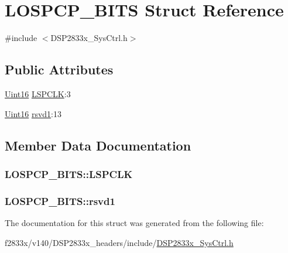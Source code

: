 \hypertarget{struct_l_o_s_p_c_p___b_i_t_s}{}\section{L\+O\+S\+P\+C\+P\+\_\+\+B\+I\+T\+S Struct Reference}
\label{struct_l_o_s_p_c_p___b_i_t_s}


{\ttfamily \#include $<$D\+S\+P2833x\+\_\+\+Sys\+Ctrl.\+h$>$}

\subsection*{Public Attributes}
\begin{DoxyCompactItemize}
\item 
\hyperlink{_d_s_p2833x___device_8h_a59a9f6be4562c327cbfb4f7e8e18f08b}{Uint16} \hyperlink{struct_l_o_s_p_c_p___b_i_t_s_a766a0fe048d5e1343de743d2202a2e16}{L\+S\+P\+C\+L\+K}\+:3
\item 
\hyperlink{_d_s_p2833x___device_8h_a59a9f6be4562c327cbfb4f7e8e18f08b}{Uint16} \hyperlink{struct_l_o_s_p_c_p___b_i_t_s_add9555cb679167bb194e235d81e5dcc3}{rsvd1}\+:13
\end{DoxyCompactItemize}


\subsection{Member Data Documentation}
\hypertarget{struct_l_o_s_p_c_p___b_i_t_s_a766a0fe048d5e1343de743d2202a2e16}{}
\subsubsection[{L\+S\+P\+C\+L\+K}]{ L\+O\+S\+P\+C\+P\+\_\+\+B\+I\+T\+S\+::\+L\+S\+P\+C\+L\+K}\label{struct_l_o_s_p_c_p___b_i_t_s_a766a0fe048d5e1343de743d2202a2e16}
\hypertarget{struct_l_o_s_p_c_p___b_i_t_s_add9555cb679167bb194e235d81e5dcc3}{}
\subsubsection[{rsvd1}]{ L\+O\+S\+P\+C\+P\+\_\+\+B\+I\+T\+S\+::rsvd1}\label{struct_l_o_s_p_c_p___b_i_t_s_add9555cb679167bb194e235d81e5dcc3}


The documentation for this struct was generated from the following file\+:\begin{DoxyCompactItemize}
\item 
f2833x/v140/\+D\+S\+P2833x\+\_\+headers/include/\hyperlink{_d_s_p2833x___sys_ctrl_8h}{D\+S\+P2833x\+\_\+\+Sys\+Ctrl.\+h}\end{DoxyCompactItemize}
